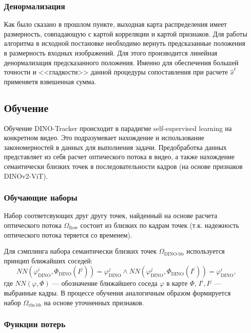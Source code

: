 \documentclass[a4paper, 14pt]{extarticle}
\theoremstyle{definition}
\theoremstyle{plain}
\theoremstyle{remark}
\begin{document}
\subsubsection{Денормализация}
Как было сказано в прошлом пункте, выходная карта распределения имеет размерность, совпадающую с картой корреляции и картой признаков.
Для работы алгоритма в исходной постановке необходимо вернуть предсказанные положения в размерность входных изображений. Для этого производится линейная денормализация предсказанного положения. Именно для обеспечения большей точности и <<гладкости>> данной процедуры сопоставления при расчете $\hat{x}^t$ применяетя взвешенная сумма.

\subsection{Обучение}
Обучение DINO-Tracker происходит в парадигме self-supervised learning на конкретном видео. 
Это подразумевает нахождение и использование закономерностей в данных для выполнения задачи. 
Предобработка данных представляет из себя расчет оптического потока в видео, а также нахождение семантически близких точек в последовательности кадров (на основе признаков DINOv2-ViT).

\subsubsection{Обучающие наборы}
Набор соответсвующих друг другу точек, найденный на основе расчета оптического потока $\Omega_{\text{flow}}$ состоит из близких по кадрам точек (т.к. надежность оптического потока теряется со временем).

Для сэмплинга набора семантически близких точек $\Omega_{\text{DINO-bb}}$ используется принцип ближайших соседей:
\begin{equation}
	NN(\varphi_{\text{DINO}}^i, \Phi_{\text{DINO}}({I}^j)) = \varphi_{\text{DINO}}^j \land NN(\varphi_{\text{DINO}}^j, \Phi_{\text{DINO}}({I}^i)) = \varphi_{\text{DINO}}^i,
\end{equation}
где $NN(\varphi, \Phi)$ --- обозначение ближайшего соседа $\varphi$ в карте $\Phi$, $I^i, I^j$ --- выбранные кадры.
В процессе обучения аналогичным образом формируется набор $\Omega_{\text{rfn-bb}}$ на основе уточненных признаков.

\subsubsection{Функции потерь}
\end{document}
